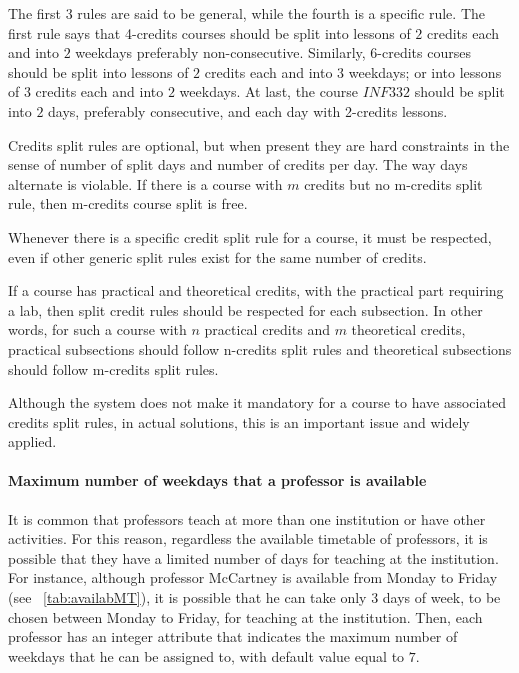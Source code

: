 The first $3$ rules are said to be general, while the fourth is a specific rule. The first rule says that 4-credits courses should be split into lessons of $2$ credits each and into $2$ weekdays preferably non-consecutive. Similarly, 6-credits courses should be split into lessons of $2$ credits each and into $3$ weekdays; or into lessons of $3$ credits each and into $2$ weekdays. At last, the course $INF332$ should be split into $2$ days, preferably consecutive, and each day with 2-credits lessons.

Credits split rules are optional, but when present they are hard constraints in the sense of number of split days and number of credits per day. The way days alternate is violable. If there is a course with $m$ credits but no m-credits split rule, then m-credits course split is free.

Whenever there is a specific credit split rule for a course, it must be respected, even if other generic split rules exist for the same number of credits.

If a course has practical and theoretical credits, with the practical part requiring a lab, then split credit rules should be respected for each subsection. In other words, for such a course with $n$ practical credits and $m$ theoretical credits, practical subsections should follow n-credits split rules and theoretical subsections should follow m-credits split rules.

Although the system does not make it mandatory for a course to have associated credits split rules, in actual solutions, this is an important issue and widely applied.


\paragraph{Maximum number of weekdays that a professor is available}
\label{constrmaxdaysprof}

It is common that professors teach at more than one institution or have other activities. For this reason, regardless the available timetable of professors, it is possible that they have a limited number of days for teaching at the institution. For instance, although professor McCartney is available from Monday to Friday (see ~\ref{tab:availabMT}), it is possible that he can take only $3$ days of week, to be chosen between Monday to Friday, for teaching at the institution. Then, each professor has an integer attribute that indicates the maximum number of weekdays that he can be assigned to, with default value equal to $7$.


